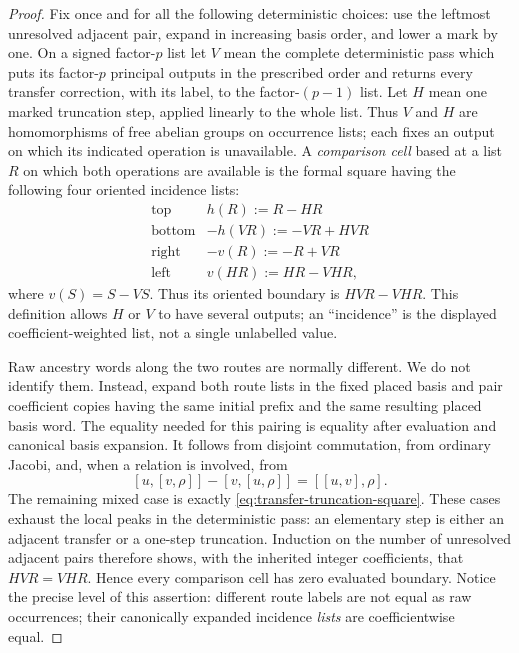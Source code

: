 \documentclass[11pt]{amsart}
\theoremstyle{remark}
\begin{document}
\begin{proof}
	Fix once and for all the following deterministic choices: use the
	leftmost unresolved adjacent pair, expand in increasing basis order,
	and lower a mark by one.  On a signed factor-$p$ list let $V$ mean the
	complete deterministic pass which puts its factor-$p$ principal outputs
	in the prescribed order and returns every transfer correction, with its
	label, to the factor-$(p-1)$ list.  Let $H$ mean one marked truncation
	step, applied linearly to the whole list.  Thus $V$ and $H$ are
	homomorphisms of free abelian groups on occurrence lists; each fixes an
	output on which its indicated operation is unavailable.  A
	\emph{comparison cell} based
	at a list $R$ on which both operations are available is the formal
	square having the following four oriented incidence lists:
	\begin{equation}\label{eq:four-incidences}
	 \begin{array}{c|c}
	 \text{top}&h(R):=R-HR\\
	 \text{bottom}&-h(VR):=-VR+HVR\\
	 \text{right}&-v(R):=-R+VR\\
	 \text{left}&v(HR):=HR-VHR,
	 \end{array}
	\end{equation}
	where $v(S)=S-VS$.  Thus its oriented boundary is
	$HVR-VHR$.  This definition allows $H$ or $V$ to have several outputs;
	an ``incidence'' is the displayed coefficient-weighted list, not a
	single unlabelled value.

	Raw ancestry words along the two routes are normally different.  We do
	not identify them.  Instead, expand both route lists in the fixed placed
	basis and pair coefficient copies having the same initial prefix and the
	same resulting placed basis word.  The equality needed for this pairing
	is equality after evaluation and canonical basis expansion.  It follows
	from disjoint commutation, from ordinary Jacobi, and, when a relation is
	involved, from
	\begin{equation}\label{eq:CE-relation-Jacobi}
	 [u,[v,\rho]]-[v,[u,\rho]]=[[u,v],\rho].
	\end{equation}
	The remaining mixed case is exactly
	\eqref{eq:transfer-truncation-square}.  These cases exhaust the local
	peaks in the deterministic pass: an elementary step is either an
	adjacent transfer or a one-step truncation.  Induction on the number of
	unresolved adjacent pairs therefore shows, with the inherited integer
	coefficients, that $HVR=VHR$.  Hence every comparison cell has zero
	evaluated boundary.
	Notice the precise level of this assertion: different route labels are
	not equal as raw occurrences; their canonically expanded incidence
	\emph{lists} are coefficientwise equal.


\end{proof}
\end{document}
